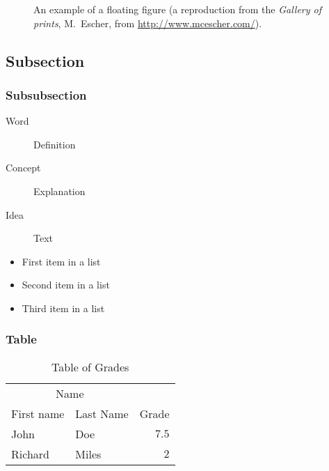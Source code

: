 \documentclass[
12pt, %
a4paper, %
oneside, %
headinclude,footinclude, %
BCOR5mm, %
german]{scrartcl}
\begin{document}
\begin{figure}[tb]
\centering 
\caption[An example of a floating figure]{An example of a floating figure (a reproduction from the \emph{Gallery of prints}, M.~Escher, from \url{http://www.mcescher.com/}).} %
\label{fig:gallery} 
\end{figure}

\lipsum[10] %


\subsection{Subsection}

\lipsum[11] %

\subsubsection{Subsubsection}

\lipsum[12] %

\begin{description}
\item[Word] Definition
\item[Concept] Explanation
\item[Idea] Text
\end{description}

\lipsum[12] %

\begin{itemize}[noitemsep] %
\item First item in a list
\item Second item in a list
\item Third item in a list
\end{itemize}

\subsubsection{Table}

\lipsum[13] %

\begin{table}[hbt]
\caption{Table of Grades}
\centering
\begin{tabular}{llr}
\toprule
\multicolumn{2}{c}{Name} \\
\cmidrule(r){1-2}
First name & Last Name & Grade \\
\midrule
John & Doe & $7.5$ \\
Richard & Miles & $2$ \\
\bottomrule
\end{tabular}
\label{tab:label}
\end{table}
\end{document}
